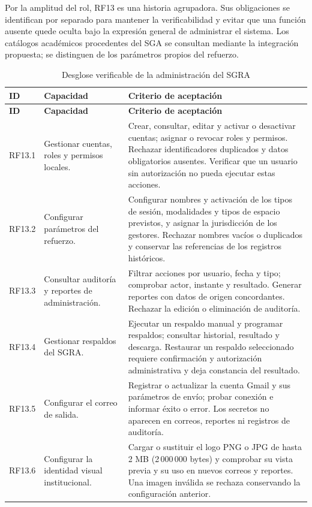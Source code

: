 Por la amplitud del rol, RF13 es una historia agrupadora.
Sus obligaciones se identifican por separado para mantener
la verificabilidad y evitar que una función ausente quede
oculta bajo la expresión general de administrar el sistema.
Los catálogos académicos procedentes del SGA se consultan
mediante la integración propuesta; se distinguen de los
parámetros propios del refuerzo.

\begin{longtable}{@{}p{}p{}p{}@{}}
\caption{Desglose verificable de la administración del SGRA}
\label{tab:rf-administracion}\\
\toprule\textbf{ID}&\textbf{Capacidad}&\textbf{Criterio de aceptación}\\\midrule\endfirsthead
\toprule\textbf{ID}&\textbf{Capacidad}&\textbf{Criterio de aceptación}\\\midrule\endhead
RF13.1 & Gestionar cuentas, roles y permisos locales. &
Crear, consultar, editar y activar o desactivar cuentas;
asignar o revocar roles y permisos. Rechazar identificadores
duplicados y datos obligatorios ausentes. Verificar que un
usuario sin autorización no pueda ejecutar estas acciones.\\\addlinespace
RF13.2 & Configurar parámetros del refuerzo. &
Configurar nombres y activación de los tipos de sesión,
modalidades y tipos de espacio previstos, y asignar
la jurisdicción de los gestores. Rechazar nombres vacíos
o duplicados y conservar las referencias de los registros históricos.\\\addlinespace
RF13.3 & Consultar auditoría y reportes de administración. &
Filtrar acciones por usuario, fecha y tipo; comprobar actor,
instante y resultado. Generar reportes con datos de origen
concordantes. Rechazar la edición o eliminación de auditoría.\\\addlinespace
RF13.4 & Gestionar respaldos del SGRA. &
Ejecutar un respaldo manual y programar respaldos;
consultar historial, resultado y descarga. Restaurar un
respaldo seleccionado requiere confirmación y autorización
administrativa y deja constancia del resultado.\\\addlinespace
RF13.5 & Configurar el correo de salida. &
Registrar o actualizar la cuenta Gmail y sus parámetros de envío;
probar conexión e informar éxito o error. Los secretos no
aparecen en correos, reportes ni registros de auditoría.\\\addlinespace
RF13.6 & Configurar la identidad visual institucional. &
Cargar o sustituir el logo PNG o JPG de hasta 2 MB
(2\,000\,000 bytes) y comprobar su vista previa
y su uso en nuevos correos y reportes. Una imagen inválida
se rechaza conservando la configuración anterior.\\
\bottomrule
\end{longtable}

